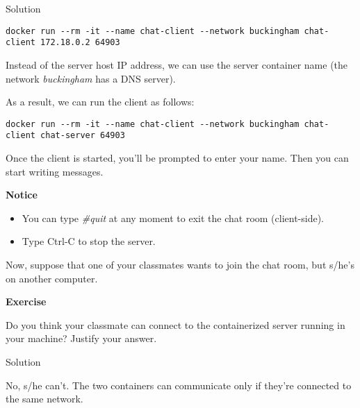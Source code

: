 \documentclass[
]{article}
\newenvironment{infobox}[1]
  {
  \begin{itemize}
  \renewcommand{\labelitemi}{
    \raisebox{-.7\height}[0pt][0pt]{
      
    }
  }
  \setlength{\fboxsep}{1em}
  \begin{whitebox}
  \item
  }
  {
  \end{whitebox}
  \end{itemize}
  }
\theoremstyle{definition}
\theoremstyle{definition}
\theoremstyle{definition}
\theoremstyle{remark}
\let\BeginKnitrBlock\begin \let\EndKnitrBlock\end
\begin{document}
Solution

\begin{infobox}{exercisebox}

\begin{verbatim}
docker run --rm -it --name chat-client --network buckingham chat-client 172.18.0.2 64903
\end{verbatim}

Instead of the server host IP address, we can use the
server container name (the network \emph{buckingham} has a DNS server).

As a result, we can run the client as follows:

\begin{verbatim}
docker run --rm -it --name chat-client --network buckingham chat-client chat-server 64903
\end{verbatim}

\end{infobox}

Once the client is started, you'll be prompted to enter your name.
Then you can start writing messages.

\begin{infobox}{warning}

\textbf{Notice}

\begin{itemize}
\item
  You can type \emph{\#quit} at any moment to exit the chat room (client-side).
\item
  Type Ctrl-C to stop the server.
\end{itemize}

\end{infobox}

Now, suppose that one of your classmates wants to join the chat room, but
s/he's on another computer.

\begin{infobox}{exercisebox}

\textbf{Exercise}

\BeginKnitrBlock{exercise}
\protect\hypertarget{exr:unnamed-chunk-42}{}{\label{exr:unnamed-chunk-42} }Do you think your classmate can connect to the containerized server running in
your machine? Justify your answer.
\EndKnitrBlock{exercise}

\end{infobox}

Solution

\begin{infobox}{exercisebox}

No, s/he can't.
The two containers can communicate only if they're connected to the same
network.

\end{infobox}
\end{document}
